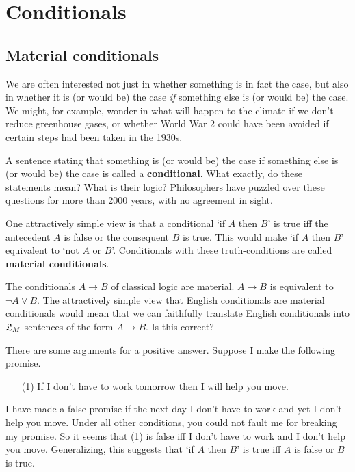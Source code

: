 \chapter{Conditionals}\label{ch:conditionals}

\section{Material conditionals}\label{sec:material}

We are often interested not just in whether something is in fact the case, but
also in whether it is (or would be) the case \emph{if} something else is (or
would be) the case. We might, for example, wonder in what will happen to the
climate if we don't reduce greenhouse gases, or whether World War 2 could have
been avoided if certain steps had been taken in the 1930s.

A sentence stating that something is (or would be) the case if something else is
(or would be) the case is called a \textbf{conditional}. What exactly, do these
statements mean? What is their logic? Philosophers have puzzled over these
questions for more than 2000 years, with no agreement in sight.

One attractively simple view is that a conditional `if $A$ then $B$' is true iff
the antecedent $A$ is false or the consequent $B$ is true. This would make `if
$A$ then $B$' equivalent to `not $A$ or $B$'. Conditionals with these
truth-conditions are called \textbf{material conditionals}.

The conditionals $A \to B$ of classical logic are material. $A \to B$ is
equivalent to $\neg A \lor B$. The attractively simple view that English
conditionals are material conditionals would mean that we can faithfully
translate English conditionals into $\mathfrak{L}_{M}$-sentences of the form $A \to B$. Is
this correct?

There are some arguments for a positive answer. Suppose I make the following
promise.
\begin{itemize}[leftmargin=10mm]
  \item[(1)] If I don't have to work tomorrow then I will help you move.
\end{itemize}
I have made a false promise if the next day I don't have to work and yet I don't
help you move. Under all other conditions, you could not fault me for breaking my
promise. So it seems that (1) is false iff I don't have to work and I don't help
you move. Generalizing, this suggests that `if $A$ then $B$' is true iff $A$ is
false or $B$ is true.

